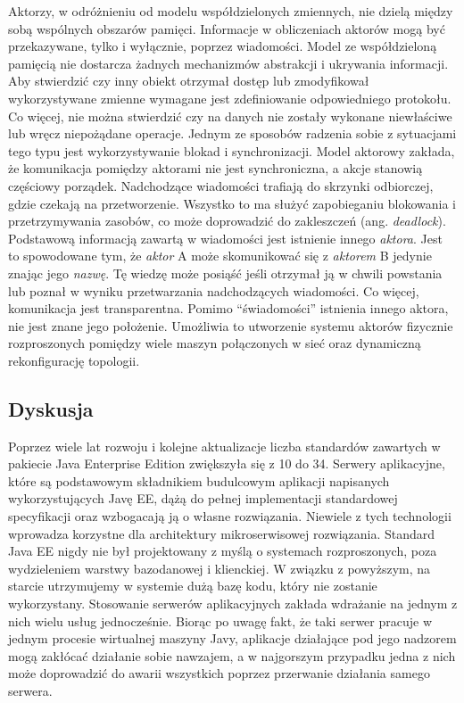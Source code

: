 \documentclass[12pt,twoside]{article}
\begin{document}
Aktorzy, w odróżnieniu od modelu współdzielonych zmiennych, nie dzielą
między sobą wspólnych obszarów pamięci. Informacje w obliczeniach
aktorów mogą być przekazywane, tylko i wyłącznie, poprzez wiadomości.
Model ze współdzieloną pamięcią nie dostarcza żadnych mechanizmów
abstrakcji i ukrywania informacji. Aby stwierdzić czy inny obiekt
otrzymał dostęp lub zmodyfikował wykorzystywane zmienne wymagane jest
zdefiniowanie odpowiedniego protokołu. Co więcej, nie można stwierdzić
czy na danych nie zostały wykonane niewłaściwe lub wręcz niepożądane
operacje. Jednym ze sposobów radzenia sobie z sytuacjami tego typu jest
wykorzystywanie blokad i synchronizacji. Model aktorowy zakłada, że
komunikacja pomiędzy aktorami nie jest synchroniczna, a akcje stanowią
częściowy porządek. Nadchodzące wiadomości trafiają do skrzynki
odbiorczej, gdzie czekają na przetworzenie. Wszystko to ma służyć
zapobieganiu blokowania i przetrzymywania zasobów, co może doprowadzić
do zakleszczeń (ang. \emph{deadlock}). Podstawową informacją zawartą w
wiadomości jest istnienie innego \emph{aktora}. Jest to spowodowane tym,
że \emph{aktor} A może skomunikować się z \emph{aktorem} B jedynie
znając jego \emph{nazwę}. Tę wiedzę może posiąść jeśli otrzymał ją w
chwili powstania lub poznał w wyniku przetwarzania nadchodzących
wiadomości. Co więcej, komunikacja jest transparentna. Pomimo
``świadomości'' istnienia innego aktora, nie jest znane jego położenie.
Umożliwia to utworzenie systemu aktorów fizycznie rozproszonych pomiędzy
wiele maszyn połączonych w sieć oraz dynamiczną rekonfigurację
topologii.\autocite{karmani2009actor, hewitt1977laws, agha86actors}

\subsection{Dyskusja}\label{dyskusja}

Poprzez wiele lat rozwoju i kolejne aktualizacje liczba standardów
zawartych w pakiecie Java Enterprise Edition zwiększyła się z 10 do 34.
Serwery aplikacyjne, które są podstawowym składnikiem budulcowym
aplikacji napisanych wykorzystujących Javę EE, dążą do pełnej
implementacji standardowej specyfikacji oraz wzbogacają ją o własne
rozwiązania. Niewiele z tych technologii wprowadza korzystne dla
architektury mikroserwisowej rozwiązania. Standard Java EE nigdy nie był
projektowany z myślą o systemach rozproszonych, poza wydzieleniem
warstwy bazodanowej i klienckiej. W związku z powyższym, na starcie
utrzymujemy w systemie dużą bazę kodu, który nie zostanie wykorzystany.
Stosowanie serwerów aplikacyjnych zakłada wdrażanie na jednym z nich
wielu usług jednocześnie. Biorąc po uwagę fakt, że taki serwer pracuje w
jednym procesie wirtualnej maszyny Javy, aplikacje działające pod jego
nadzorem mogą zakłócać działanie sobie nawzajem, a w najgorszym
przypadku jedna z nich może doprowadzić do awarii wszystkich poprzez
przerwanie działania samego serwera.
\end{document}
